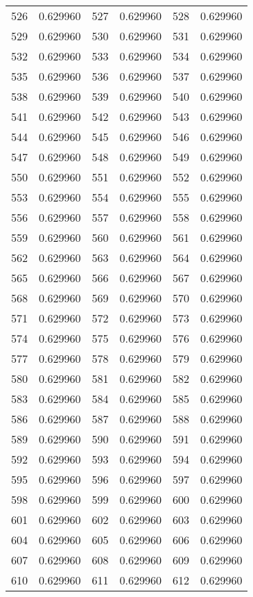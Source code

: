 \documentclass[12pt]{article}
\begin{document}
\begin{longtable}{@{}cc|cc|cc@{}}
526 & 0.629960 & 527 & 0.629960 & 528 & 0.629960 \\
529 & 0.629960 & 530 & 0.629960 & 531 & 0.629960 \\
532 & 0.629960 & 533 & 0.629960 & 534 & 0.629960 \\
535 & 0.629960 & 536 & 0.629960 & 537 & 0.629960 \\
538 & 0.629960 & 539 & 0.629960 & 540 & 0.629960 \\
541 & 0.629960 & 542 & 0.629960 & 543 & 0.629960 \\
544 & 0.629960 & 545 & 0.629960 & 546 & 0.629960 \\
547 & 0.629960 & 548 & 0.629960 & 549 & 0.629960 \\
550 & 0.629960 & 551 & 0.629960 & 552 & 0.629960 \\
553 & 0.629960 & 554 & 0.629960 & 555 & 0.629960 \\
556 & 0.629960 & 557 & 0.629960 & 558 & 0.629960 \\
559 & 0.629960 & 560 & 0.629960 & 561 & 0.629960 \\
562 & 0.629960 & 563 & 0.629960 & 564 & 0.629960 \\
565 & 0.629960 & 566 & 0.629960 & 567 & 0.629960 \\
568 & 0.629960 & 569 & 0.629960 & 570 & 0.629960 \\
571 & 0.629960 & 572 & 0.629960 & 573 & 0.629960 \\
574 & 0.629960 & 575 & 0.629960 & 576 & 0.629960 \\
577 & 0.629960 & 578 & 0.629960 & 579 & 0.629960 \\
580 & 0.629960 & 581 & 0.629960 & 582 & 0.629960 \\
583 & 0.629960 & 584 & 0.629960 & 585 & 0.629960 \\
586 & 0.629960 & 587 & 0.629960 & 588 & 0.629960 \\
589 & 0.629960 & 590 & 0.629960 & 591 & 0.629960 \\
592 & 0.629960 & 593 & 0.629960 & 594 & 0.629960 \\
595 & 0.629960 & 596 & 0.629960 & 597 & 0.629960 \\
598 & 0.629960 & 599 & 0.629960 & 600 & 0.629960 \\
601 & 0.629960 & 602 & 0.629960 & 603 & 0.629960 \\
604 & 0.629960 & 605 & 0.629960 & 606 & 0.629960 \\
607 & 0.629960 & 608 & 0.629960 & 609 & 0.629960 \\
610 & 0.629960 & 611 & 0.629960 & 612 & 0.629960 \\

\end{longtable}
\end{document}
